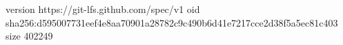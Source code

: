 version https://git-lfs.github.com/spec/v1
oid sha256:d595007731eef4e8aa70901a28782c9c490b6d41e7217cce2d38f5a5ec81c403
size 402249
